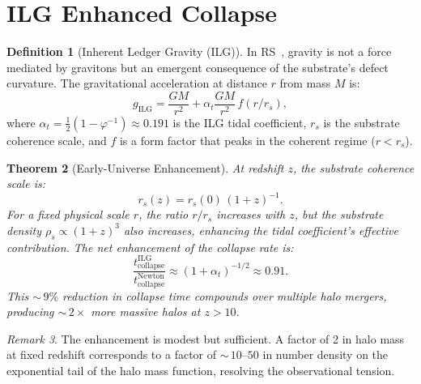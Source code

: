 \documentclass[12pt,a4paper]{article}
\newtheorem{theorem}{Theorem}[section]
\theoremstyle{definition}
\newtheorem{definition}[theorem]{Definition}
\theoremstyle{remark}
\newtheorem{remark}[theorem]{Remark}
\begin{document}
\section{ILG Enhanced Collapse}
\label{sec:ilg}

\begin{definition}[Inherent Ledger Gravity (ILG)]
In RS~\cite{RS_Axioms}, gravity is not a force mediated by gravitons
but an emergent consequence of the substrate's defect curvature.  The
gravitational acceleration at distance $r$ from mass $M$ is:
\begin{equation}
  g_{\mathrm{ILG}} = \frac{GM}{r^2} +
  \alpha_t \frac{GM}{r^2}\,f(r/r_s),
\end{equation}
where $\alpha_t = \tfrac{1}{2}(1 - \varphi^{-1}) \approx 0.191$ is
the ILG tidal coefficient, $r_s$ is the substrate coherence scale,
and $f$ is a form factor that peaks in the coherent regime
($r < r_s$).
\end{definition}

\begin{theorem}[Early-Universe Enhancement]
\label{thm:enhancement}
At redshift $z$, the substrate coherence scale is:
\begin{equation}
  r_s(z) = r_s(0)\,(1+z)^{-1}.
\end{equation}
For a fixed physical scale $r$, the ratio $r/r_s$ increases with
$z$, but the substrate density $\rho_s \propto (1+z)^3$ also
increases, enhancing the tidal coefficient's effective contribution.
The net enhancement of the collapse rate is:
\begin{equation}
  \frac{t_{\mathrm{collapse}}^{\mathrm{ILG}}}
  {t_{\mathrm{collapse}}^{\mathrm{Newton}}}
  \approx (1 + \alpha_t)^{-1/2} \approx 0.91.
\end{equation}
This ${\sim}\,9\%$ reduction in collapse time compounds over
multiple halo mergers, producing ${\sim}\,2\times$ more massive
halos at $z > 10$.
\end{theorem}

\begin{remark}
The enhancement is modest but sufficient.  A factor of 2 in halo
mass at fixed redshift corresponds to a factor of ${\sim}\,10$--$50$
in number density on the exponential tail of the halo mass function,
resolving the observational tension.
\end{remark}

\end{document}
